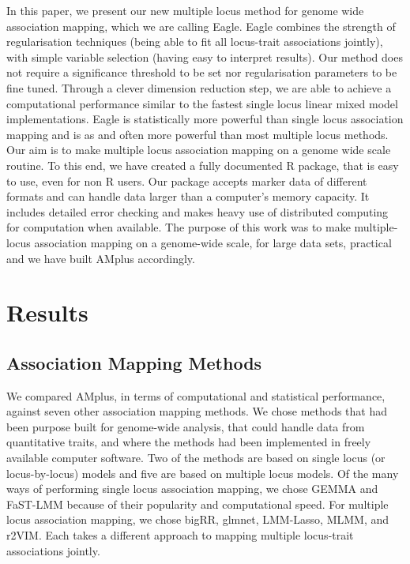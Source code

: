 \documentclass{nature}
\begin{document}
In this paper, we present our new multiple locus method for genome wide association mapping, which we are calling Eagle. Eagle combines the strength of regularisation techniques (being able to fit all locus-trait associations jointly), with simple variable selection (having easy to interpret results). Our method does not require a significance threshold to be set nor regularisation parameters to be fine tuned. Through a clever dimension reduction step, we are able to achieve a computational performance similar to the fastest single locus linear mixed model implementations. Eagle is statistically more powerful than single locus association mapping and is as and often more powerful than 
most multiple locus methods. Our aim is to make multiple locus association mapping on a genome wide scale routine. To this end, we have created a fully documented R package, that is easy to use, even for non R users.  Our package accepts marker data of different 
formats and can handle data larger than a computer's  memory capacity. It includes detailed error checking and makes heavy use of 
distributed computing for computation when available.  The purpose of this work was to make multiple-locus association mapping on 
a genome-wide scale, for large data sets,  practical and we have built AMplus accordingly. 


\section{Results}

\subsection{Association Mapping Methods}

We compared AMplus, in terms of computational and statistical performance, against seven other association mapping methods. 
We chose methods that had been purpose built for genome-wide analysis, that could handle data from quantitative traits, and where the methods had been implemented in freely available computer software. Two of the methods are based on single locus (or locus-by-locus) models and five are based on multiple locus models. Of the many ways of performing single locus association mapping, we chose GEMMA and FaST-LMM because of their popularity and computational speed. For multiple locus association mapping, we chose bigRR, glmnet, LMM-Lasso, MLMM, and r2VIM.  Each takes a different approach to mapping multiple locus-trait associations jointly.
\end{document}
